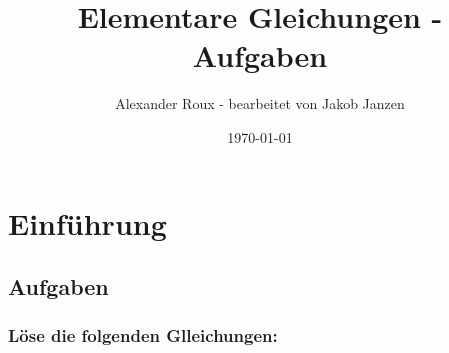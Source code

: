 \documentclass[a4paper,12pt]{article} %
\begin{document}
\title{Elementare Gleichungen - Aufgaben} %
\author{Alexander Roux - bearbeitet von Jakob Janzen} %
\date{\today} %
\maketitle %

\tableofcontents %

\newpage %

\section{Einführung}

\subsection{Aufgaben}

\subsubsection{Löse die folgenden Glleichungen:} %
\end{document}
